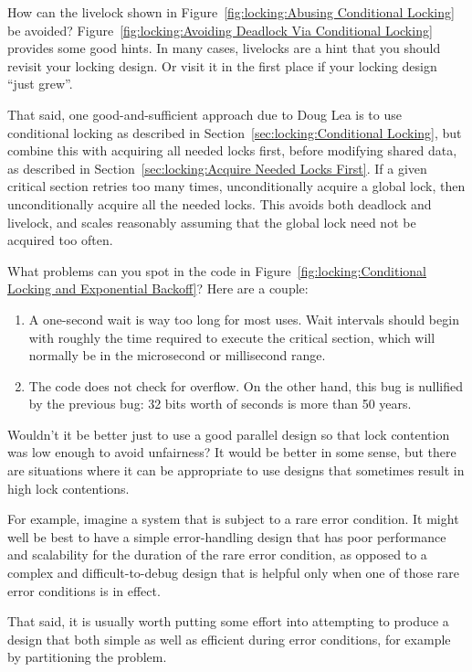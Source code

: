 \begin{enumerate}
\QuickQ{}
	How can the livelock shown in
	Figure~\ref{fig:locking:Abusing Conditional Locking}
	be avoided?
\QuickA{}
	Figure~\ref{fig:locking:Avoiding Deadlock Via Conditional Locking}
	provides some good hints.
	In many cases, livelocks are a hint that you should revisit your
	locking design.
	Or visit it in the first place if your locking design
	``just grew''.

	That said, one good-and-sufficient approach due to Doug Lea
	is to use conditional locking as described in
	Section~\ref{sec:locking:Conditional Locking}, but combine this
	with acquiring all needed locks first, before modifying shared
	data, as described in
	Section~\ref{sec:locking:Acquire Needed Locks First}.
	If a given critical section retries too many times,
	unconditionally acquire
	a global lock, then unconditionally acquire all the needed locks.
	This avoids both deadlock and livelock, and scales reasonably
	assuming that the global lock need not be acquired too often.

\QuickQ{}
	What problems can you spot in the code in
	Figure~\ref{fig:locking:Conditional Locking and Exponential Backoff}?
\QuickA{}
	Here are a couple:
	\begin{enumerate}
	\item	A one-second wait is way too long for most uses.
		Wait intervals should begin with roughly the time
		required to execute the critical section, which will
		normally be in the microsecond or millisecond range.
	\item	The code does not check for overflow.
		On the other hand, this bug is nullified
		by the previous bug: 32 bits worth of seconds is
		more than 50 years.
	\end{enumerate}

\QuickQ{}
	Wouldn't it be better just to use a good parallel design
	so that lock contention was low enough to avoid unfairness?
\QuickA{}
	It would be better in some sense, but there are situations
	where it can be appropriate to use
	designs that sometimes result in high lock contentions.

	For example, imagine a system that is subject to a rare error
	condition.
	It might well be best to have a simple error-handling design
	that has poor performance and scalability for the duration of
	the rare error condition, as opposed to a complex and
	difficult-to-debug design that is helpful only when one of
	those rare error conditions is in effect.

	That said, it is usually worth putting some effort into
	attempting to produce a design that both simple as well as
	efficient during error conditions, for example by partitioning
	the problem.


\end{enumerate}
